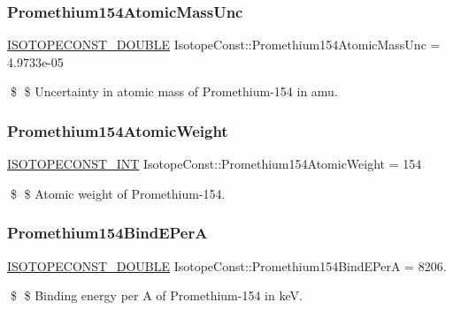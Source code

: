 \subsubsection{\texorpdfstring{Promethium154\+Atomic\+Mass\+Unc}{Promethium154AtomicMassUnc}}
{\footnotesize\ttfamily \mbox{\hyperlink{group___isotope_const-_macros_ga8f45a7272ce02c0b4c65c44636ed719a}{I\+S\+O\+T\+O\+P\+E\+C\+O\+N\+S\+T\+\_\+\+D\+O\+U\+B\+LE}} Isotope\+Const\+::\+Promethium154\+Atomic\+Mass\+Unc = 4.\+9733e-\/05}

\$ \$ Uncertainty in atomic mass of Promethium-\/154 in amu. \mbox{\label{group___isotope_const-_promethium-_pm154_ga1f130d9e7df8f599387762a75432a81d}} 
\subsubsection{\texorpdfstring{Promethium154\+Atomic\+Weight}{Promethium154AtomicWeight}}
{\footnotesize\ttfamily \mbox{\hyperlink{group___isotope_const-_macros_ga5f18360b3e99483a35c32d789e62621c}{I\+S\+O\+T\+O\+P\+E\+C\+O\+N\+S\+T\+\_\+\+I\+NT}} Isotope\+Const\+::\+Promethium154\+Atomic\+Weight = 154}

\$ \$ Atomic weight of Promethium-\/154. \mbox{\label{group___isotope_const-_promethium-_pm154_ga5539144b5a432e4228beed20980ad88e}} 
\subsubsection{\texorpdfstring{Promethium154\+Bind\+E\+PerA}{Promethium154BindEPerA}}
{\footnotesize\ttfamily \mbox{\hyperlink{group___isotope_const-_macros_ga8f45a7272ce02c0b4c65c44636ed719a}{I\+S\+O\+T\+O\+P\+E\+C\+O\+N\+S\+T\+\_\+\+D\+O\+U\+B\+LE}} Isotope\+Const\+::\+Promethium154\+Bind\+E\+PerA = 8206.}

\$ \$ Binding energy per A of Promethium-\/154 in keV. \mbox{\label{group___isotope_const-_promethium-_pm154_ga8212d49362dad33b635c26261a298b07}} 
